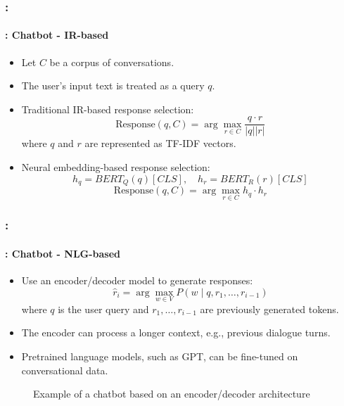 \documentclass[xcolor=table]{beamer}
\begin{document}
\begin{frame}
	\frametitle{\insertshortsubtitle: \insertsection}
	\framesubtitle{\insertsubsection: Chatbot - IR-based}
	
	\begin{itemize}
		\item Let $C$ be a corpus of conversations.
		\item The user's input text is treated as a query $q$.
		\item Traditional IR-based response selection:
		\[\text{Response}(q, C) = \arg\max_{r \in C} \frac{q \cdot r}{|q| |r|}\]
		where $q$ and $r$ are represented as TF-IDF vectors.
		\item Neural embedding-based response selection:
		\[
		h_q = BERT_Q(q)[CLS],\quad h_r = BERT_R(r)[CLS]
		\]
		\[
		\text{Response}(q, C) = \arg\max_{r \in C} h_q \cdot h_r
		\]
	\end{itemize}
	
\end{frame}

\begin{frame}
	\frametitle{\insertshortsubtitle: \insertsection}
	\framesubtitle{\insertsubsection: Chatbot - NLG-based}
	
	\begin{itemize}
		\item Use an encoder/decoder model to generate responses:
		\[
		\hat{r}_i = \arg\max_{w \in V} P(w \mid q, r_1, \ldots, r_{i-1})
		\]
		where $q$ is the user query and $r_1, \ldots, r_{i-1}$ are previously generated tokens.
		
		\item The encoder can process a longer context, e.g., previous dialogue turns.
		
		\item Pretrained language models, such as GPT, can be fine-tuned on conversational data.
	\end{itemize}
	
	\vspace{-6pt}
	\begin{figure}
		\centering
		\caption{Example of a chatbot based on an encoder/decoder architecture \cite{2020-jurafsky-martin}}
	\end{figure}
	
\end{frame}
\end{document}
